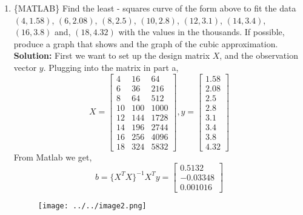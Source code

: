 \documentclass{amsart}
\begin{document}
\begin{enumerate}
\item \{MATLAB\} Find the least - squares curve of the form above to fit the data $(4,1.58)$, $(6,2.08)$, $(8 , 2.5)$, $(10, 2.8)$, $(12,3.1)$, $(14,3.4)$, $(16,3.8)$ and, $(18, 4.32)$ with the values in the thousands. If possible, produce a graph that shows and the graph of the cubic approximation.\\
\noindent \textbf{Solution: } First we want to set up the design matrix $X$, and the observation vector $y$. Plugging into the matrix in part a,
\begin{equation*}
X = 
\begin{bmatrix}
4  & 16  & 64  \\
6  &  36 &   216\\
 8 &  64 &   512\\
 10 & 100  &   1000\\
12  & 144  &  1728\\
14  &  196 &   2744\\
 16 &  256 &   4096\\
 18 &  324 &  5832 
\end{bmatrix}, 
y = 
\begin{bmatrix}
1.58  \\
2.08  \\ 
 2.5 \\
 2.8 \\ 
3.1  \\ 
3.4  \\  
 3.8 \\  
4.32 
\end{bmatrix}
\end{equation*}
From Matlab we get,
\begin{equation*}
b = \{X^TX\}^{-1}X^Ty =
\begin{bmatrix}
0.5132  \\
-0.03348 \\ 
 0.001016 
\end{bmatrix}
\end{equation*}

\begin{figure}
\centering
        \texttt{[image: ../../image2.png]}
            \label{figure 1: Graph of LLS}
\end{figure}
\vspace{1in}
\end{enumerate}
\end{document}
